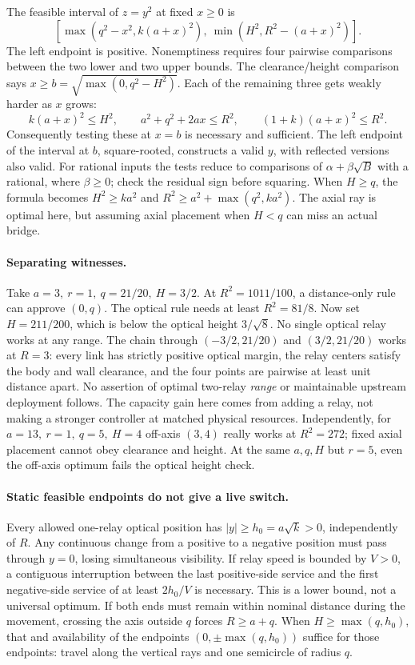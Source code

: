 \documentclass{article}
\begin{document}
The feasible interval of \(z=y^2\) at fixed \(x\ge0\) is
\[
 [\max(q^2-x^2,k(a+x)^2),\ \min(H^2,R^2-(a+x)^2)] .
\]
The left endpoint is positive. Nonemptiness requires four pairwise
comparisons between the two lower and two upper bounds.
The clearance/height comparison says \(x\ge b=\sqrt{\max(0,q^2-H^2)}\).
Each of the remaining three gets weakly harder as \(x\) grows:
\[
 k(a+x)^2\le H^2,\qquad a^2+q^2+2ax\le R^2,\qquad
 (1+k)(a+x)^2\le R^2 .
\]
Consequently testing these at \(x=b\) is necessary and sufficient.
The left endpoint of the interval at \(b\), square-rooted, constructs
a valid \(y\), with reflected versions also valid. For rational inputs
the tests reduce to comparisons of \(\alpha+\beta\sqrt{B}\) with a
rational, where \(\beta\ge0\); check the residual sign before squaring.
When \(H\ge q\), the formula becomes \(H^2\ge ka^2\) and
\(R^2\ge a^2+\max(q^2,ka^2)\). The axial ray is optimal here, but
assuming axial placement when \(H<q\) can miss an actual bridge.

\paragraph{Separating witnesses.}
Take \(a=3,\ r=1,\ q=21/20,\ H=3/2\). At \(R^2=1011/100\),
a distance-only rule can approve \((0,q)\). The optical rule needs at
least \(R^2=81/8\). Now set \(H=211/200\), which is below the optical
height \(3/\sqrt 8\). No single optical relay works at any range.
The chain through \((-3/2,21/20)\) and \((3/2,21/20)\) works at \(R=3\):
every link has strictly positive optical margin, the relay centers
satisfy the body and wall clearance, and the four points are pairwise
at least unit distance apart. No assertion of optimal two-relay
\emph{range} or maintainable upstream deployment follows. The capacity
gain here comes from adding a relay, not making a stronger controller
at matched physical resources. Independently, for \(a=13,\ r=1,\ q=5,\ H=4\)
off-axis \((3,4)\) really works at \(R^2=272\); fixed axial placement
cannot obey clearance and height. At the same \(a,q,H\) but \(r=5\),
even the off-axis optimum fails the optical height check.

\paragraph{Static feasible endpoints do not give a live switch.}
Every allowed one-relay optical position has
\(|y|\ge h_0=a\sqrt{k}>0\), independently of \(R\).
Any continuous change from a positive to a negative position must pass
through \(y=0\), losing simultaneous visibility. If relay speed is
bounded by \(V>0\), a contiguous interruption between the last
positive-side service and the first negative-side service of at least
\(2h_0/V\) is necessary. This is a lower bound, not a universal optimum.
If both ends must remain within nominal distance during the movement,
crossing the axis outside \(q\) forces \(R\ge a+q\).
When \(H\ge\max(q,h_0)\), that and availability of the endpoints
\((0,\pm\max(q,h_0))\) suffice for those endpoints: travel along the
vertical rays and one semicircle of radius \(q\).
\end{document}
